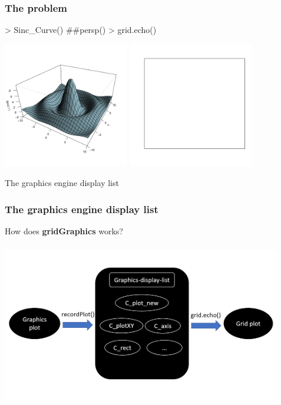\documentclass{beamer}
\begin{document}
\begin{frame}[fragile]
\frametitle{The problem}
\begin{Schunk}
\begin{Sinput}
> Sinc_Curve() ##persp()
> grid.echo()
\end{Sinput}
\end{Schunk}
\begin{center}
  \includegraphics[height = 5.5cm, width = 5.5cm]{plot/persp_1}
  \includegraphics[height = 5.5cm, width = 5.5cm]{plot/blank}
\end{center}
  
\end{frame}



\begin{frame}[fragile]
\begin{center}
  \Huge{The graphics engine display list}
\end{center}
\end{frame}



\begin{frame}[fragile]
\frametitle{The graphics engine display list}
How does \textbf{gridGraphics} works?
\begin{center}
  \includegraphics[height = 7.2cm, width = 12.2cm]{plot/display_list.PNG}
\end{center}
\end{frame}
\end{document}
